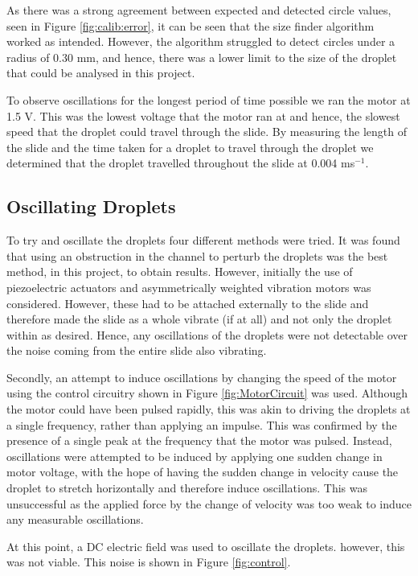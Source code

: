 \documentclass{physics_article_B}
\begin{document}
        As there was a strong agreement between expected and detected circle values, seen in Figure \ref{fig:calib:error}, it can be seen that the size finder algorithm worked as intended. However, the algorithm struggled to detect circles under a radius of 0.30 mm, and hence, there was a lower limit to the size of the droplet that could be analysed in this project.
        
        To observe oscillations for the longest period of time possible we ran the motor at 1.5 V. This was the lowest voltage that the motor ran at and hence, the slowest speed that the droplet could travel through the slide. By measuring the length of the slide and the time taken for a droplet to travel through the droplet we determined that the droplet travelled throughout the slide at 0.004 ms$^{-1}$.  
        
    \subsection{Oscillating Droplets}
      
        To try and oscillate the droplets four different methods were tried. It was found that using an obstruction in the channel to perturb the droplets was the best method, in this project, to obtain results. However, initially the use of piezoelectric actuators and asymmetrically weighted vibration motors was considered. However, these had to be attached externally to the slide and therefore made the slide as a whole vibrate (if at all) and not only the droplet within as desired. Hence, any oscillations of the droplets were not detectable over the noise coming from the entire slide also vibrating.
        
        Secondly, an attempt to induce oscillations by changing the speed of the motor using the control circuitry shown in Figure \ref{fig:MotorCircuit} was used. Although the motor could have been pulsed rapidly, this was akin to driving the droplets at a single frequency, rather than applying an impulse. This was confirmed by the presence of a single peak at the frequency that the motor was pulsed. Instead, oscillations were attempted to be induced by applying one sudden change in motor voltage, with the hope of having the sudden change in velocity cause the droplet to stretch horizontally and therefore induce oscillations. This was unsuccessful as the applied force by the change of velocity was too weak to induce any measurable oscillations.
        
        At this point, a DC electric field was used to oscillate the droplets. however, this was not viable. This noise is shown in Figure \ref{fig:control}. 
        
\end{document}
